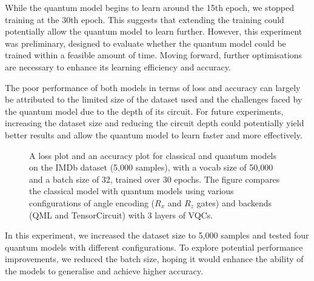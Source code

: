 While the quantum model begins to learn around the 15th epoch, we
stopped training at the 30th epoch. This suggests that extending the
training could potentially allow the quantum model to learn further.
However, this experiment was preliminary, designed to evaluate
whether the quantum model could be trained within a feasible amount
of time. Moving forward, further optimisations are necessary to
enhance its learning efficiency and accuracy.

The poor performance of both models in terms of loss and accuracy can
largely be attributed to the limited size of the dataset used and the
challenges faced by the quantum model due to the depth of its
circuit. For future experiments, increasing the dataset size and
reducing the circuit depth could potentially yield better results and
allow the quantum model to learn faster and more effectively.

\begin{figure}[h]
  \begin{center}
  \end{center}
  \vspace{-0.5cm}
  \caption{A loss plot and an accuracy plot for classical and quantum
    models on the IMDb dataset (5,000 samples), with a vocab size of
    50,000 and a batch size of 32, trained over 30 epochs. The figure
    compares the classical model with quantum models using various
    configurations of angle encoding (\(R_x\) and \(R_z\) gates) and backends
  (QML and TensorCircuit) with 3 layers of \glspl{VQC}.}
  \label{fig:2_3_4_5_6}
\end{figure}

In this experiment, we increased the dataset size to 5,000 samples
and tested four quantum models with different configurations. To
explore potential performance improvements, we reduced the batch
size, hoping it would enhance the ability of the models to generalise and
achieve higher accuracy.

